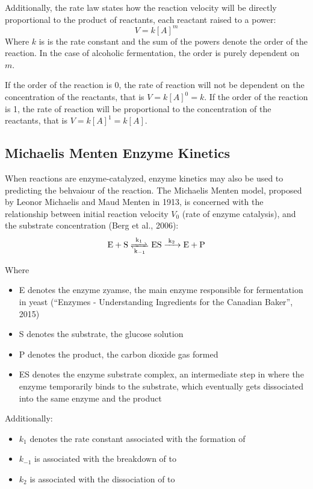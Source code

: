 \documentclass{article}
\begin{document}
Additionally, the rate law states how the reaction velocity will be directly proportional to the product of reactants, each reactant raised to a power:
\begin{equation}
    V = k[A]^m
\end{equation}
Where $k$ is is the rate constant and the sum of the powers denote the order of the reaction. In the case of alcoholic fermentation, the order is purely dependent on $m$.

\medskip

If the order of the reaction is 0, the rate of reaction will not be dependent on the concentration of the reactants, that is $V = k[A]^0 = k$. If the order of the reaction is 1, the rate of reaction will be proportional to the concentration of the reactants, that is $V = k[A]^1 = k[A]$.

\subsection{Michaelis Menten Enzyme Kinetics}
When reactions are enzyme-catalyzed, enzyme kinetics may also be used to predicting the behvaiour of the reaction. The Michaelis Menten model, proposed by Leonor Michaelis and Maud Menten in 1913, is concerned with the relationship between initial reaction velocity $V_0$ (rate of enzyme catalysis), and the substrate concentration (Berg et al., 2006):
\begin{equation}
    \ce{E + S <=>[k_1][k_{-1}] ES ->[k_2] E + P}
\end{equation}

Where
\begin{itemize}[topsep=\parskip, noitemsep]
    \item E denotes the enzyme zyamse, the main enzyme responsible for fermentation in yeast (“Enzymes - Understanding Ingredients for the Canadian Baker”, 2015)
    \item S denotes the substrate, the glucose solution
    \item P denotes the product, the carbon dioxide gas formed
    \item ES denotes the enzyme substrate complex, an intermediate step in where the enzyme temporarily binds to the substrate, which eventually gets dissociated into the same enzyme and the product
\end{itemize}

\medskip

Additionally:
\begin{itemize}[topsep=\parskip, noitemsep]
    \item $k_1$ denotes the rate constant associated with the formation of 
    \item $k_{-1}$ is associated with the breakdown of  to 
    \item $k_2$ is associated with the dissociation of  to 
\end{itemize}
\end{document}
